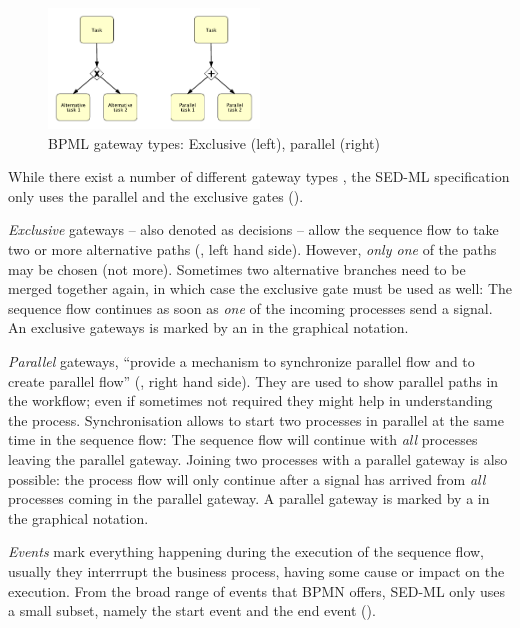 \begin{figure}[h]
\centering
\includegraphics[width=0.5\textwidth]{images/gateways.pdf}
\caption{BPML gateway types: Exclusive (left), parallel (right)}
\label{fig:gateways}
\end{figure}

While there exist a number of different gateway types \citep[p.~93]{White:2004}, the SED-ML specification only uses the parallel and the exclusive gates  (). 

\emph{Exclusive} gateways -- also denoted as decisions -- allow the sequence flow to take two or more alternative paths (, left hand side). However, \emph{only one} of the paths may be chosen (not more). Sometimes two alternative branches need to be merged together again, in which case the exclusive gate must be used as well: The sequence flow continues as soon as \emph{one} of the incoming processes send a signal. An exclusive gateways is marked by an  in the graphical notation.

\emph{Parallel} gateways, ``provide a mechanism to synchronize parallel flow and to create parallel flow'' \citep{White:2004} (, right hand side). They are used to show parallel paths in the workflow; even if sometimes not required they might help in understanding the process. Synchronisation allows to start two processes in parallel at the same time in the sequence flow: The sequence flow will continue with \emph{all} processes leaving the parallel gateway. Joining two processes with a parallel gateway is also possible: the process flow will only continue after a signal has arrived from \emph{all} processes coming in the parallel gateway. A parallel gateway is marked by a \code{+} in the graphical notation.

\emph{Events} mark everything happening during the execution of the sequence flow, usually they interrrupt the business process, having some cause or impact on the execution. From the broad range of events that BPMN offers, SED-ML only uses a small subset, namely the start event and the end event ().

